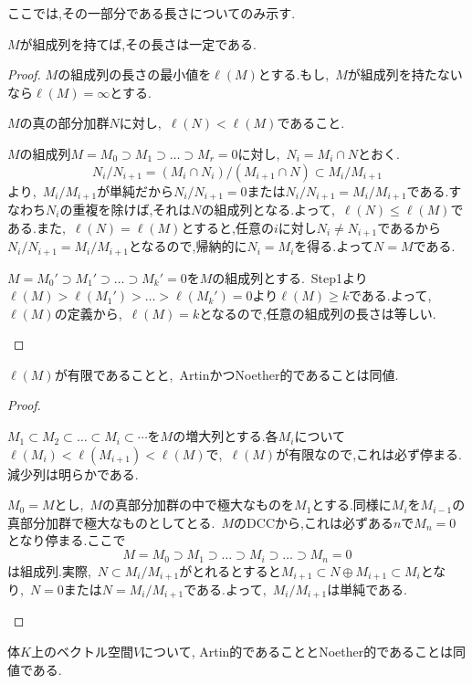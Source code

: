 ここでは,その一部分である長さについてのみ示す.
\begin{prop}
	$M$が組成列を持てば,その長さは一定である.
\end{prop}
\begin{proof}
	$M$の組成列の長さの最小値を$\ell(M)$とする.もし,~$M$が組成列を持たないなら$\ell(M)=\infty$とする.
	\begin{step}
		\item $M$の真の部分加群$N$に対し,~$\ell(N)<\ell(M)$であること.
		
		$M$の組成列$M=M_0\supset M_1\supset\dots\supset M_r=0$に対し,~$N_i=M_i\cap N$とおく.
		\[N_i/N_{i+1}=(M_i\cap N_i)/(M_{i+1}\cap N)\subset M_i/M_{i+1}\]
		より,~$M_i/M_{i+1}$が単純だから$N_i/N_{i+1}=0$または$N_i/N_{i+1}=M_i/M_{i+1}$である.すなわち$N_i$の重複を除けば,それは$N$の組成列となる.よって,~$\ell(N)\leq\ell(M)$である.また,~$\ell(N)=\ell(M)$とすると,任意の$i$に対し$N_i\neq N_{i+1}$であるから$N_i/N_{i+1}=M_i/M_{i+1}$となるので,帰納的に$N_i=M_i$を得る.よって$N=M$である.
		
		\item 
		$M={M_0}'\supset{M_1}'\supset\dots\supset{M_k}'=0$を$M$の組成列とする.~Step1より$\ell(M)>\ell({M_1}')>\dots>\ell({M_k}')=0$より$\ell(M)\geq k$である.よって,~$\ell(M)$の定義から,~$\ell(M)=k$となるので,任意の組成列の長さは等しい.
	\end{step}
\end{proof}
\begin{prop}\label{prop:有限な組成列の同値条件}
	$\ell(M)$が有限であることと,~ArtinかつNoether的であることは同値.
\end{prop}
\begin{proof}
	\begin{eqv}
		\item 
		$M_1\subset M_2\subset\dots\subset M_i\subset\cdots$を$M$の増大列とする.各$M_i$について$\ell(M_i)<\ell(M_{i+1})<\ell(M)$で,~$\ell(M)$が有限なので,これは必ず停まる.減少列は明らかである.
		\item 
		$M_0=M$とし,~$M$の真部分加群の中で極大なものを$M_1$とする.同様に$M_i$を$M_{i-1}$の真部分加群で極大なものとしてとる.~$M$のDCCから,これは必ずある$n$で$M_n=0$となり停まる.ここで
		\[M=M_0\supset M_1\supset\dots\supset M_i\supset\dots\supset M_n=0\]
		は組成列.実際,~$N\subset M_i/M_{i+1}$がとれるとすると$M_{i+1}\subset N\oplus M_{i+1}\subset M_i$となり,~$N=0$または$N=M_i/M_{i+1}$である.よって,~$M_i/M_{i+1}$は単純である.
	\end{eqv}
\end{proof}
\begin{prop}\label{prop:Artin的なベクトル空間はNoether}
	体$K$上のベクトル空間$V$について, Artin的であることとNoether的であることは同値である.
\end{prop}
